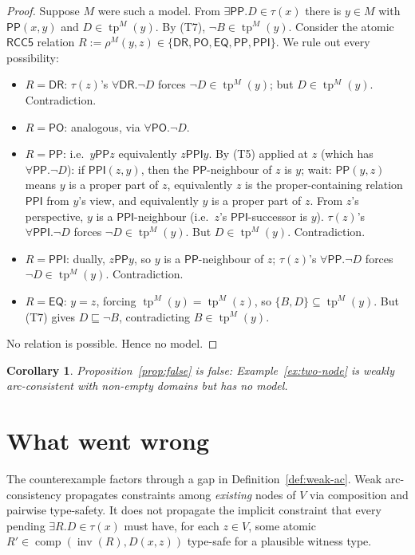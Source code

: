 \documentclass[11pt]{article}
\newtheorem{corollary}[theorem]{Corollary}
\theoremstyle{definition}
\theoremstyle{remark}
\newcommand{\DR}{\mathsf{DR}}
\newcommand{\PO}{\mathsf{PO}}
\newcommand{\PP}{\mathsf{PP}}
\newcommand{\PPI}{\mathsf{PPI}}
\newcommand{\EQ}{\mathsf{EQ}}
\newcommand{\RCCall}{\{\DR,\PO,\EQ,\PP,\PPI\}}
\newcommand{\tp}{\operatorname{tp}}
\newcommand{\comp}{\operatorname{comp}}
\newcommand{\inv}{\operatorname{inv}}
\begin{document}
\begin{proof}
Suppose $M$ were such a model.  From $\exists \PP. D \in \tau(x)$
there is $y \in M$ with $\PP(x, y)$ and $D \in \tp^M(y)$.  By (T7),
$\neg B \in \tp^M(y)$.  Consider the atomic $\mathsf{RCC5}$ relation
$R := \rho^M(y, z) \in \RCCall$.  We rule out every possibility:
\begin{itemize}
  \item $R = \DR$: $\tau(z)$'s $\forall \DR. \neg D$ forces $\neg D
    \in \tp^M(y)$; but $D \in \tp^M(y)$.  Contradiction.
  \item $R = \PO$: analogous, via $\forall \PO. \neg D$.
  \item $R = \PP$: i.e.\ $y \PP z$ equivalently $z \PPI y$.  By (T5)
    applied at $z$ (which has $\forall \PP. \neg D$): if $\PPI(z,y)$,
    then the $\PP$-neighbour of $z$ is $y$; wait: $\PP(y,z)$ means
    $y$ is a proper part of $z$, equivalently $z$ is the
    proper-containing relation $\PPI$ from $y$'s view, and
    equivalently $y$ is a proper part of $z$.
    From $z$'s perspective, $y$ is a $\PPI$-neighbour
    (i.e.\ $z$'s $\PPI$-successor is $y$).  $\tau(z)$'s
    $\forall \PPI. \neg D$ forces $\neg D \in \tp^M(y)$.  But
    $D \in \tp^M(y)$.  Contradiction.
  \item $R = \PPI$: dually, $z \PP y$, so $y$ is a $\PP$-neighbour of
    $z$; $\tau(z)$'s $\forall \PP. \neg D$ forces $\neg D \in
    \tp^M(y)$.  Contradiction.
  \item $R = \EQ$: $y = z$, forcing $\tp^M(y) = \tp^M(z)$, so
    $\{B, D\} \subseteq \tp^M(y)$.  But (T7) gives
    $D \sqsubseteq \neg B$, contradicting $B \in \tp^M(y)$.
\end{itemize}
No relation is possible.  Hence no model.
\end{proof}

\begin{corollary}
Proposition~\ref{prop:false} is false:
Example~\ref{ex:two-node} is weakly arc-consistent with non-empty
domains but has no model.
\end{corollary}

\section{What went wrong}
\label{sec:analysis}

The counterexample factors through a gap in Definition~\ref{def:weak-ac}.
Weak arc-consistency propagates constraints among \emph{existing}
nodes of $V$ via composition and pairwise type-safety.  It does not
propagate the implicit constraint that every pending
$\exists R. D \in \tau(x)$ must have, for each $z \in V$, some
atomic $R' \in \comp(\inv(R), D(x, z))$ type-safe for a plausible
witness type.
\end{document}
